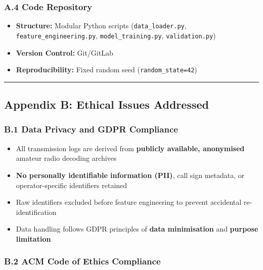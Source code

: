 \subsubsection{A.4 Code Repository}\label{a.4-code-repository}

\begin{itemize}
\tightlist
\item
  \textbf{Structure:} Modular Python scripts (\texttt{data\_loader.py},
  \texttt{feature\_engineering.py}, \texttt{model\_training.py},
  \texttt{validation.py})
\item
  \textbf{Version Control:} Git/GitLab
\item
  \textbf{Reproducibility:} Fixed random seed
  (\texttt{random\_state=42})
\end{itemize}

\begin{center}\rule{0.5\linewidth}{0.5pt}\end{center}

\subsection{Appendix B: Ethical Issues
Addressed}\label{appendix-b-ethical-issues-addressed}

\subsubsection{B.1 Data Privacy and GDPR
Compliance}\label{b.1-data-privacy-and-gdpr-compliance}

\begin{itemize}
\tightlist
\item
  All transmission logs are derived from \textbf{publicly available,
  anonymised} amateur radio decoding archives
\item
  \textbf{No personally identifiable information (PII)}, call sign
  metadata, or operator-specific identifiers retained
\item
  Raw identifiers excluded before feature engineering to prevent
  accidental re-identification
\item
  Data handling follows GDPR principles of \textbf{data minimisation}
  and \textbf{purpose limitation}
\end{itemize}

\subsubsection{B.2 ACM Code of Ethics
Compliance}\label{b.2-acm-code-of-ethics-compliance}

